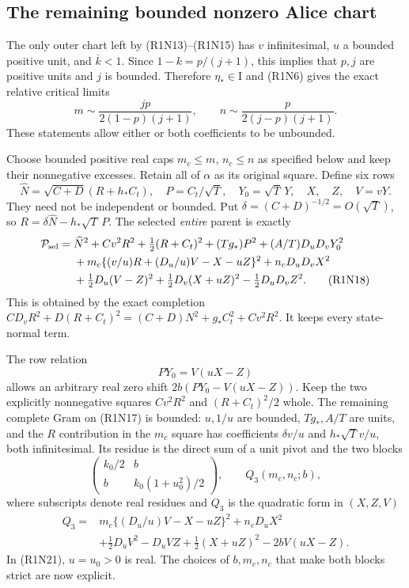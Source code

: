 \subsection{The remaining bounded nonzero Alice chart}

The only outer chart left by (R1N13)--(R1N15) has $v$ infinitesimal,
$u$ a bounded positive unit, and $\overline k<1$.  Since
$1-k=p/(j+1)$, this implies that $p,j$ are positive units and $j$
is bounded.  Therefore $\eta_*\in\mathrm I$ and (R1N6) gives the
exact relative critical limits
\[
 m\sim\frac{jp}{2(1-p)(j+1)},\qquad
 n\sim\frac{p}{2(j-p)(j+1)}.                              \tag{R1N16}
\]
These statements allow either or both coefficients to be unbounded.

Choose bounded positive real caps $m_c\le m$, $n_c\le n$ as specified
below and keep their nonnegative excesses.  Retain all of $\alpha$
as its original square.  Define six rows
\[
 \widehat N=\sqrt{C+D}(R+h_*C_t),\quad
 P=C_t/\sqrt T,\quad Y_0=\sqrt T\,Y,\quad
 X,\quad Z,\quad V=vY.                                  \tag{R1N17}
\]
They need not be independent or bounded.  Put
$\delta=(C+D)^{-1/2}=O(\sqrt T)$, so
$R=\delta\widehat N-h_*\sqrt T\,P$.
The selected \emph{entire} parent is exactly
\begin{align*}
 \mathcal P_{\rm sel}={}&
 \widehat N^2+Cv^2R^2+\tfrac12(R+C_t)^2
       +(Tg_*)P^2+(A/T)D_uD_vY_0^2\\
 &+m_c\{(v/u)R+(D_u/u)V-X-uZ\}^2+n_cD_uD_vX^2\\
 &+\tfrac12D_u(V-Z)^2+\tfrac12D_v(X+uZ)^2
                                      -\tfrac12D_uD_vZ^2 .
\tag{R1N18}
\end{align*}
This is obtained by the exact completion
$CD_vR^2+D(R+C_t)^2=(C+D)N^2+g_*C_t^2+Cv^2R^2$.
It keeps every state-normal term.

The row relation
\[
 PY_0=V(uX-Z)                                            \tag{R1N19}
\]
allows an arbitrary real zero shift
$2b(PY_0-V(uX-Z))$.  Keep the two explicitly nonnegative squares
$Cv^2R^2$ and $(R+C_t)^2/2$ whole.  The remaining complete Gram
on (R1N17) is bounded: $u,1/u$ are bounded, $Tg_*,A/T$ are
units, and the $R$ contribution in the $m_c$ square has coefficients
$\delta v/u$ and $h_*\sqrt T v/u$, both infinitesimal.
Its residue is the direct sum of a unit pivot and the two blocks
\[
 \begin{pmatrix}k_0/2&b\\b&k_0(1+u_0^2)/2\end{pmatrix},\qquad
 Q_3(m_c,n_c;b),                                        \tag{R1N20}
\]
where subscripts denote real residues and $Q_3$ is the quadratic
form in $(X,Z,V)$
\begin{align*}
 Q_3={}&m_c\{(D_u/u)V-X-uZ\}^2+n_cD_uX^2\\
       &+\tfrac12D_uV^2-D_uVZ+\tfrac12(X+uZ)^2
                                            -2bV(uX-Z).
\tag{R1N21}
\end{align*}
In (R1N21), $u=u_0>0$ is real.  The choices of $b,m_c,n_c$
that make both blocks strict are now explicit.


